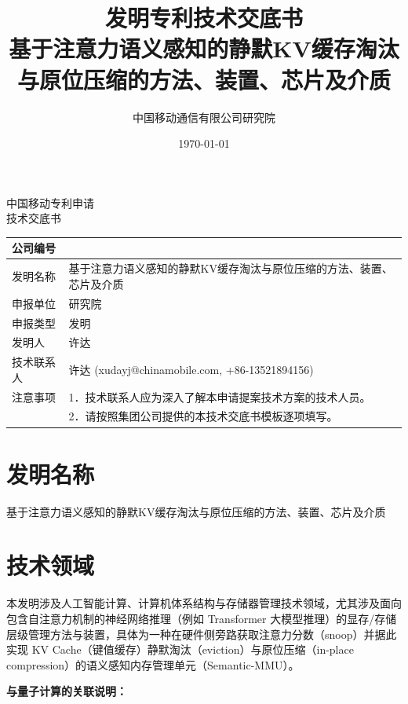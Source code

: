 \documentclass[12pt,a4paper]{article}
\title{\textbf{发明专利技术交底书} \\[0.5em]
\Large 基于注意力语义感知的静默KV缓存淘汰与原位压缩的方法、装置、芯片及介质}
\author{中国移动通信有限公司研究院}
\date{\today}
\begin{document}
\begin{center}
    {\Large\heiti 中国移动专利申请} \\[1em]
    {\Huge\heiti 技术交底书} \\[1em]
\end{center}

\noindent
\begin{tabular}{|p{3cm}|p{12cm}|}
\hline
公司编号 &  \\
\hline
发明名称 & 基于注意力语义感知的静默KV缓存淘汰与原位压缩的方法、装置、芯片及介质 \\
\hline
申报单位 & 研究院 \\
\hline
申报类型 & 发明 \\
\hline
发明人 & 许达 \\
\hline
技术联系人 & 许达 (xudayj@chinamobile.com, +86-13521894156) \\
\hline
注意事项 & 1．技术联系人应为深入了解本申请提案技术方案的技术人员。 \\
         & 2．请按照集团公司提供的本技术交底书模板逐项填写。 \\
\hline
\end{tabular}

\vspace{1cm}

\section{发明名称}

基于注意力语义感知的静默KV缓存淘汰与原位压缩的方法、装置、芯片及介质


\section{技术领域}

本发明涉及人工智能计算、计算机体系结构与存储器管理技术领域，尤其涉及面向包含自注意力机制的神经网络推理（例如 Transformer 大模型推理）的显存/存储层级管理方法与装置，具体为一种在硬件侧旁路获取注意力分数（snoop）并据此实现 KV Cache（键值缓存）静默淘汰（eviction）与原位压缩（in-place compression）的语义感知内存管理单元（Semantic-MMU）。

\textbf{与量子计算的关联说明：}
\end{document}
